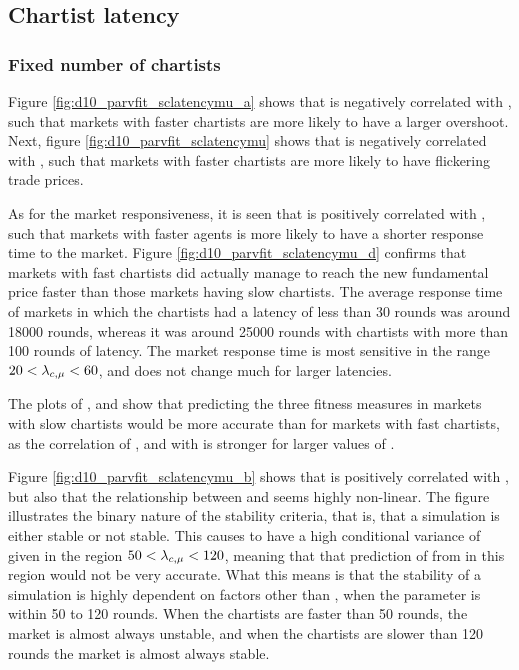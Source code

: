 \subsection{Chartist latency}

\subsubsection*{Fixed number of chartists}

Figure \ref{fig:d10_parvfit_sclatencymu_a} shows that \sclatencymu{} is negatively correlated with \overshoot, such that markets with faster chartists are more likely to have a larger overshoot.  Next, figure \ref{fig:d10_parvfit_sclatencymu}  shows that \sclatencymu{} is negatively correlated with \stdev, such that markets with faster chartists are more likely to have flickering trade prices. 

As for the market responsiveness, it is seen that \sclatencymu{} is positively correlated with \timetoreachnewfundamental, such that markets with faster agents is more likely to have a shorter response time to the market. Figure \ref{fig:d10_parvfit_sclatencymu_d} confirms that markets with fast chartists did actually manage to reach the new fundamental price faster than those markets having slow chartists. The average response time of markets in which the chartists had a latency of less than 30 rounds was around 18000 rounds, whereas it was around 25000 rounds with chartists with more than 100 rounds of latency. The market response time is most sensitive in the range $20< \lambda_{c, \mu}< 60$, and does not change much for larger latencies. 

The plots of \overshoot, \stdev{} and \timetoreachnewfundamental{} show that predicting the three fitness measures in markets with slow chartists would be more accurate than for markets with fast chartists, as the correlation of \overshoot, \stdev{} and \timetoreachnewfundamental{} with \sclatencymu{} is stronger for larger values of \sclatencymu. 

Figure \ref{fig:d10_parvfit_sclatencymu_b} shows that \sclatencymu{} is positively correlated with \roundstable, but also that the relationship between \sclatencymu{} and \roundstable{} seems highly non-linear. The figure illustrates the binary nature of the stability criteria, that is, that a simulation is either stable or not stable. This causes \roundstable{} to have a high conditional variance of \roundstable{} given \sclatencymu{} in the region $50 < \lambda_{c, \mu} < 120$, meaning that that prediction of \roundstable{} from \sclatencymu{} in this region would not be very accurate. What this means is that the stability of a simulation is highly dependent on factors other than \sclatencymu, when the parameter is within 50 to 120 rounds. When the chartists are faster than 50 rounds, the market is almost always unstable, and when the chartists are slower than 120 rounds the market is almost always stable. 

